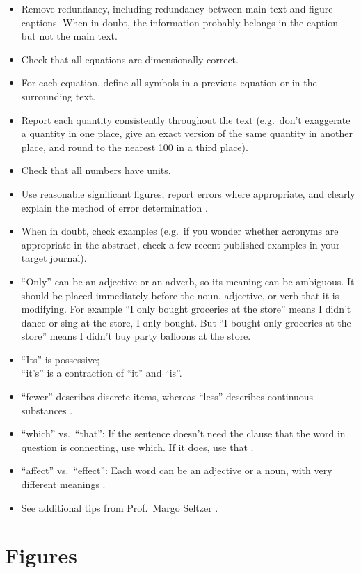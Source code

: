 \documentclass[aps,prb,twocolumn,superscriptaddress,floatfix,longbibliography]{revtex4-2}
\begin{document}
\begin{itemize}[label=$\Box$]
\item Remove redundancy, including redundancy between main text and figure captions. When in doubt, the information probably belongs in the caption but not the main text.
\item Check that all equations are dimensionally correct.
\item For each equation, define all symbols in a previous equation or in the surrounding text.
\item Report each quantity consistently throughout the text (e.g.\ don't exaggerate a quantity in one place, give an exact version of the same quantity in another place, and round to the nearest 100 in a third place).
\item Check that all numbers have units.
\item Use reasonable significant figures, report errors where appropriate, and clearly explain the method of error determination \cite{WitkovZengel2019}.
\item When in doubt, check examples (e.g.\ if you wonder whether acronyms are appropriate in the abstract, check a few recent published examples in your target journal).
\item ``Only'' can be an adjective or an adverb, so its meaning can be ambiguous. It should be placed immediately before the noun, adjective, or verb that it is modifying. For example ``I only bought groceries at the store'' means I didn't dance or sing at the store, I only bought. But ``I bought only groceries at the store'' means I didn't buy party balloons at the store.
\item ``Its'' is possessive;\\ ``it's'' is a contraction of ``it'' and ``is''.
\item ``fewer'' describes discrete items, whereas ``less'' describes continuous substances \cite{FewerLess}.
\item ``which'' vs.\ ``that'': If the sentence doesn't need the clause that the word in question is connecting, use which. If it does, use that \cite{WhichThat}.
\item ``affect'' vs.\ ``effect'': Each word can be an adjective or a noun, with very different meanings \cite{AffectEffect}.
\item See additional tips from Prof.\ Margo Seltzer \cite{SeltzerPetPeeves}.
\end{itemize}

\section{\label{sec:Figures}Figures}
\end{document}
